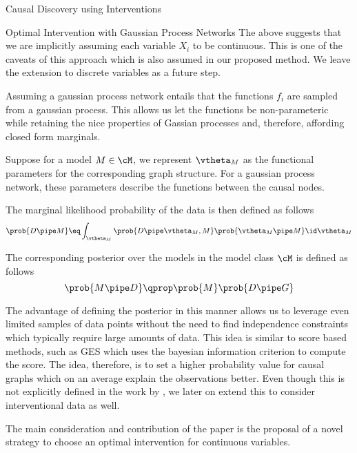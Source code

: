 \documentclass[10pt]{article}
\begin{document}
\begin{psection}[4]{Causal Discovery using Interventions}
\begin{psubsection}{Optimal Intervention with Gaussian Process Networks}
        The above suggests that we are implicitly assuming each variable $X_i$ to be
        continuous. This is one of the caveats of this approach which is also assumed
        in our proposed method. We leave the extension to discrete variables as a
        future step.
        
        Assuming a gaussian process network entails that the functions $f_i$ are sampled
        from a gaussian process. This allows us let the functions be non-parameteric
        while retaining the nice properties of Gassian processes and, therefore,
        affording closed form marginals.

        Suppose for a model $M \in \cM$, we represent $\vtheta_M$ as the functional
        parameters for the corresponding graph structure. For a gaussian process
        network, these parameters describe the functions between the causal nodes.

        The marginal likelihood probability of the data is then defined as follows
        \begin{equation}%
            \label{eq:data_likelihood}
            \prob{D \pipe M} \eq \int_{\vtheta_M} \prob{D \pipe \vtheta_M, M} \prob{\vtheta_M \pipe M} \id \vtheta_M
        \end{equation}

        The corresponding posterior over the models in the model class $\cM$ is defined
        as follows
        \begin{equation}%
            \label{eq:model_posterior}    
            \prob{M \pipe D} \qprop \prob{M} \prob{D \pipe G}
        \end{equation}

        The advantage of defining the posterior in this manner allows us to leverage
        even limited samples of data points without the need to find independence
        constraints which typically require large amounts of data. This idea is
        similar to score based methods, such as GES which uses the bayesian
        information criterion to compute the score. The idea, therefore, is to
        set a higher probability value for causal graphs which on an average
        explain the observations better. Even though this is not explicitly defined
        in the work by \citet{kgelgen2019optimal}, we later on extend this to
        consider interventional data as well.

        The main consideration and contribution of the paper is the proposal of a novel
        strategy to choose an optimal intervention for continuous variables.


\end{psubsection}
\end{psection}
\end{document}
